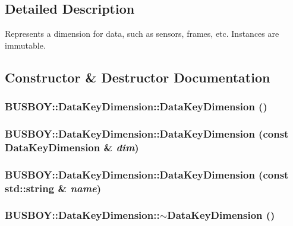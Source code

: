 \subsection{Detailed Description}
Represents a dimension for data, such as sensors, frames, etc. Instances are immutable. 

\subsection{Constructor \& Destructor Documentation}
\hypertarget{classBUSBOY_1_1DataKeyDimension_a9cf8d377d60c09b2443fc50cdb740ec9}{
\subsubsection[{DataKeyDimension}]{\setlength{\rightskip}{0pt plus 5cm}BUSBOY::DataKeyDimension::DataKeyDimension ()}}
\label{classBUSBOY_1_1DataKeyDimension_a9cf8d377d60c09b2443fc50cdb740ec9}
\hypertarget{classBUSBOY_1_1DataKeyDimension_acd624d40a9aac264a19f443183ced702}{
\subsubsection[{DataKeyDimension}]{\setlength{\rightskip}{0pt plus 5cm}BUSBOY::DataKeyDimension::DataKeyDimension (const {\bf DataKeyDimension} \& {\em dim})}}
\label{classBUSBOY_1_1DataKeyDimension_acd624d40a9aac264a19f443183ced702}
\hypertarget{classBUSBOY_1_1DataKeyDimension_ac359a8884b6088878fa7669ecc9bbeb0}{
\subsubsection[{DataKeyDimension}]{\setlength{\rightskip}{0pt plus 5cm}BUSBOY::DataKeyDimension::DataKeyDimension (const std::string \& {\em name})}}
\label{classBUSBOY_1_1DataKeyDimension_ac359a8884b6088878fa7669ecc9bbeb0}
\hypertarget{classBUSBOY_1_1DataKeyDimension_a2ee1d504f9520285e2b8ad17eaf1d955}{
\subsubsection[{$\sim$DataKeyDimension}]{\setlength{\rightskip}{0pt plus 5cm}BUSBOY::DataKeyDimension::$\sim$DataKeyDimension ()}}
\label{classBUSBOY_1_1DataKeyDimension_a2ee1d504f9520285e2b8ad17eaf1d955}


